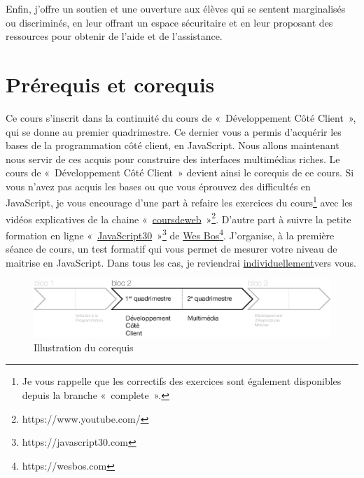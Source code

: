 Enfin, j'offre un soutien et une ouverture aux élèves qui se sentent marginalisés ou discriminés, en leur offrant un espace sécuritaire et en leur proposant des ressources pour obtenir de l'aide et de l'assistance.

\clearpage
\section{Prérequis et corequis}
Ce cours s’inscrit dans la continuité du cours de «~Développement Côté Client~», qui se donne au premier quadrimestre. Ce dernier vous a permis d’acquérir les bases de la programmation côté client, en JavaScript. Nous allons maintenant nous servir de ces acquis pour construire des interfaces multimédias riches. Le cours de «~Développement Côté Client~» devient ainsi le corequis de ce cours.
Si vous n’avez pas acquis les bases ou que vous éprouvez des difficultés en JavaScript, je vous encourage d’une part à refaire les exercices du cours\footnote{Je vous rappelle que les correctifs des exercices sont également disponibles depuis la branche «~complete~».} avec les vidéos explicatives de la chaine «~\href{https://www.youtube.com/@coursdeweb}{coursdeweb}~»\footnote{https://www.youtube.com/\@coursdeweb}. D’autre part à suivre la petite formation en ligne «~\href{https://javascript30.com}{JavaScript30}~»\footnote{https://javascript30.com} de \href{https://wesbos.com}{Wes Bos}\footnote{https://wesbos.com}. J'organise, à la première séance de cours, un test formatif qui vous permet de mesurer votre niveau de maitrise en JavaScript. Dans tous les cas, je reviendrai \underline{individuellement}vers vous.

\begin{figure}[H]
    \begin{center}
        \includegraphics[width=\textwidth]{figures/corequis.eps}
        \caption{Illustration du corequis}
        \label{Fig:GQM}
    \end{center}
\end{figure}
\clearpage

